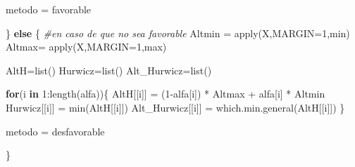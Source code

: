 \documentclass[
]{article}
\newenvironment{Shaded}{\begin{snugshade}}{\end{snugshade}}
\newcommand{\AttributeTok}[1]{\textcolor[rgb]{0.77,0.63,0.00}{#1}}
\newcommand{\CommentTok}[1]{\textcolor[rgb]{0.56,0.35,0.01}{\textit{#1}}}
\newcommand{\ControlFlowTok}[1]{\textcolor[rgb]{0.13,0.29,0.53}{\textbf{#1}}}
\newcommand{\DecValTok}[1]{\textcolor[rgb]{0.00,0.00,0.81}{#1}}
\newcommand{\FunctionTok}[1]{\textcolor[rgb]{0.00,0.00,0.00}{#1}}
\newcommand{\NormalTok}[1]{#1}
\newcommand{\OtherTok}[1]{\textcolor[rgb]{0.56,0.35,0.01}{#1}}
\newcommand{\SpecialCharTok}[1]{\textcolor[rgb]{0.00,0.00,0.00}{#1}}
\newcommand{\StringTok}[1]{\textcolor[rgb]{0.31,0.60,0.02}{#1}}
\begin{document}
\begin{Shaded}
\begin{Highlighting}[]
\NormalTok{    metodo }\OtherTok{=} \StringTok{\textquotesingle{}favorable\textquotesingle{}}
    
\NormalTok{  \} }\ControlFlowTok{else}\NormalTok{ \{ }\CommentTok{\#en caso de que no sea favorable}
\NormalTok{    Altmin }\OtherTok{=} \FunctionTok{apply}\NormalTok{(X,}\AttributeTok{MARGIN=}\DecValTok{1}\NormalTok{,min)}
\NormalTok{    Altmax}\OtherTok{=} \FunctionTok{apply}\NormalTok{(X,}\AttributeTok{MARGIN=}\DecValTok{1}\NormalTok{,max)}
    
\NormalTok{    AltH}\OtherTok{=}\FunctionTok{list}\NormalTok{()}
\NormalTok{    Hurwicz}\OtherTok{=}\FunctionTok{list}\NormalTok{()}
\NormalTok{    Alt\_Hurwicz}\OtherTok{=}\FunctionTok{list}\NormalTok{()}
    
    \ControlFlowTok{for}\NormalTok{(i }\ControlFlowTok{in} \DecValTok{1}\SpecialCharTok{:}\FunctionTok{length}\NormalTok{(alfa))\{}
\NormalTok{      AltH[[i]] }\OtherTok{=}\NormalTok{ (}\DecValTok{1}\SpecialCharTok{{-}}\NormalTok{alfa[i]) }\SpecialCharTok{*}\NormalTok{ Altmax }\SpecialCharTok{+}\NormalTok{ alfa[i] }\SpecialCharTok{*}\NormalTok{ Altmin }
\NormalTok{      Hurwicz[[i]] }\OtherTok{=} \FunctionTok{min}\NormalTok{(AltH[[i]])}
\NormalTok{      Alt\_Hurwicz[[i]] }\OtherTok{=} \FunctionTok{which.min.general}\NormalTok{(AltH[[i]])}
\NormalTok{    \}}
    
\NormalTok{    metodo }\OtherTok{=} \StringTok{\textquotesingle{}desfavorable\textquotesingle{}}
    
\NormalTok{  \}}
  

\end{Highlighting}
\end{Shaded}
\end{document}
